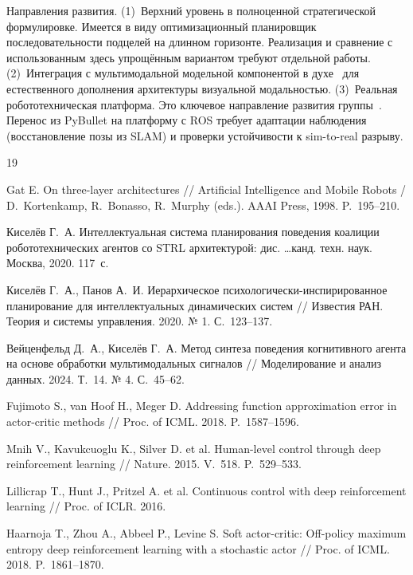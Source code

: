 \documentclass[11pt]{article}
\begin{document}
Направления развития. (1)~Верхний уровень в полноценной стратегической формулировке. Имеется в виду оптимизационный планировщик последовательности подцелей на длинном горизонте. Реализация и сравнение с использованным здесь упрощённым вариантом требуют отдельной работы. (2)~Интеграция с мультимодальной модельной компонентой в духе~\cite{veitsenfeld2024} для естественного дополнения архитектуры визуальной модальностью. (3)~Реальная робототехническая платформа. Это ключевое направление развития группы~\cite{kiselev2020dissertation}. Перенос из PyBullet на платформу с ROS требует адаптации наблюдения (восстановление позы из SLAM) и проверки устойчивости к sim-to-real разрыву.


\begin{thebibliography}{19}

Gat E. On three-layer architectures
// Artificial Intelligence and Mobile Robots / D.~Kortenkamp, R.~Bonasso, R.~Murphy (eds.). AAAI Press, 1998. P.~195--210.

Киселёв Г.~А. Интеллектуальная система планирования поведения коалиции робототехнических агентов со STRL архитектурой:
дис. \dots канд. техн. наук. Москва, 2020. 117~с.

Киселёв Г.~А., Панов А.~И. Иерархическое психологически-инспирированное планирование для интеллектуальных динамических систем
// Известия РАН. Теория и системы управления. 2020. № 1. С.~123--137.

Вейценфельд Д.~А., Киселёв Г.~А. Метод синтеза поведения когнитивного агента на основе обработки мультимодальных сигналов
// Моделирование и анализ данных. 2024. Т.~14. № 4. С.~45--62.

Fujimoto S., van Hoof H., Meger D. Addressing function approximation error in actor-critic methods
// Proc. of ICML. 2018. P.~1587--1596.

Mnih V., Kavukcuoglu K., Silver D. et al. Human-level control through deep reinforcement learning
// Nature. 2015. V.~518. P.~529--533.

Lillicrap T., Hunt J., Pritzel A. et al. Continuous control with deep reinforcement learning
// Proc. of ICLR. 2016.

Haarnoja T., Zhou A., Abbeel P., Levine S. Soft actor-critic: Off-policy maximum entropy deep reinforcement learning with a stochastic actor
// Proc. of ICML. 2018. P.~1861--1870.


\end{thebibliography}
\end{document}
